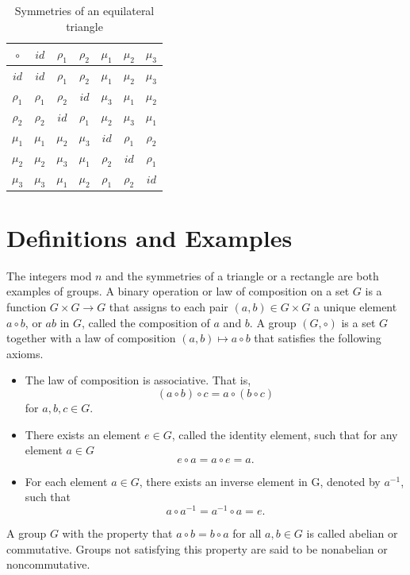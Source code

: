 \begin{table}
\caption{Symmetries of an equilateral triangle}{\small
\begin{center}
\begin{tabular}{c|cccccc}
$\circ$  & $id$     & $\rho_1$ & $\rho_2$ & $\mu_1$ & $\mu_2$ & $\mu_3$ \\
\hline
$id$     & $id$     & $\rho_1$ & $\rho_2$ & $\mu_1$ & $\mu_2$ & $\mu_3$ \\
$\rho_1$ & $\rho_1$ & $\rho_2$ & $id$     & $\mu_3$ & $\mu_1$ & $\mu_2$ \\
$\rho_2$ & $\rho_2$ & $id$     & $\rho_1$ & $\mu_2$ & $\mu_3$ & $\mu_1$ \\
$\mu_1$  & $\mu_1$  & $\mu_2$  & $\mu_3$  & $id$    & $\rho_1$& $\rho_2$\\
$\mu_2$  & $\mu_2$  & $\mu_3$  & $\mu_1$  & $\rho_2$& $id$    & $\rho_1$\\
$\mu_3$  & $\mu_3$  & $\mu_1$  & $\mu_2$  & $\rho_1$& $\rho_2$& $id$
\end{tabular}
\end{center}
}
\label{S3_table}
\end{table}
 
 
\section{Definitions and Examples}\label{groups_section_define}

 
The integers mod $n$ and the symmetries of a triangle or a rectangle are both examples of groups.  A {\bfi binary operation\/} or {\bfi law of composition\/} on a set $G$ is a function $G \times G \rightarrow G$ that assigns to each pair $(a,b) \in G \times G$ a unique element $a \circ b$, or $ab$ in $G$, called the composition of $a$ and $b$.  A {\bfi group} $(G, \circ )$ is a set $G$ together with a law of composition $(a,b) \mapsto a \circ b$ that satisfies the following axioms. 
\begin{itemize}
 
\item
The law of composition is {\bfi associative}. That is,
\[
(a \circ b) \circ c = a \circ (b \circ c)
\]
for $a, b, c \in G$.
 
\item
There exists an element $e \in G$, called the {\bfi identity element}, such that for any element $a \in G$ 
\[
e \circ a = a \circ e = a.
\]
 
\item
For each element $a \in G$, there exists an {\bfi inverse element\/} in G, denoted by $a^{-1}$, such that 
\[
a \circ a^{-1} = a^{-1} \circ a = e.
\]
\end{itemize}
A group $G$ with the property that $a \circ b = b \circ a$ for all $a, b \in G$ is called {\bfi abelian\/} or {\bfi commutative}.  Groups not satisfying this property are said to be  {\bfi nonabelian\/} or {\bfi noncommutative}.  


